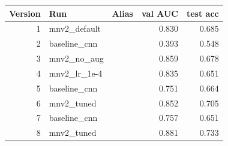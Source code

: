 \begin{tabular}{rllrr}
\toprule
\textbf{Version} & \textbf{Run} & \textbf{Alias} & \textbf{val AUC} & \textbf{test acc} \\
\midrule
1 & mnv2\_default &  & 0.830 & 0.685 \\
2 & baseline\_cnn &  & 0.393 & 0.548 \\
3 & mnv2\_no\_aug &  & 0.859 & 0.678 \\
4 & mnv2\_lr\_1e-4 &  & 0.835 & 0.651 \\
5 & baseline\_cnn &  & 0.751 & 0.664 \\
6 & mnv2\_tuned &  & 0.852 & 0.705 \\
7 & baseline\_cnn &  & 0.757 & 0.651 \\
8 & mnv2\_tuned &  & 0.881 & 0.733 \\
\bottomrule
\end{tabular}
